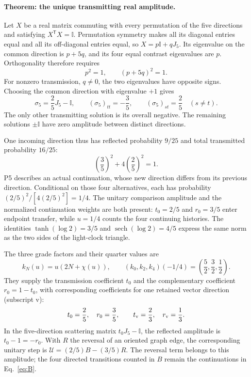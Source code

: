 \documentclass[aps,prx,onecolumn,10pt,notitlepage,nofootinbib,longbibliography]{revtex4-2}
\numberwithin{equation}{section}
\numberwithin{table}{section}
\newcommand{\Id}{\mathbb I}
\begin{document}
\paragraph*{Theorem: the unique transmitting real amplitude.}
Let $X$ be a real matrix commuting with every permutation of the five directions and satisfying $X^{\mathsf T}X=\Id$. Permutation symmetry makes all its diagonal entries equal and all its off-diagonal entries equal, so $X=p\Id+qJ_5$. Its eigenvalue on the common direction is $p+5q$, and its four equal contrast eigenvalues are $p$. Orthogonality therefore requires
\begin{equation}
 p^2=1,\qquad (p+5q)^2=1.
\end{equation}
For nonzero transmission, $q\ne0$, the two eigenvalues have opposite signs. Choosing the common direction with eigenvalue $+1$ gives
\begin{equation}
 \boxed{\sigma_5=\frac25J_5-\Id,\qquad
 (\sigma_5)_{tt}=-\frac35,\qquad
 (\sigma_5)_{st}=\frac25\quad(s\ne t).}
 \label{eq:stepreflection}
\end{equation}
The only other transmitting solution is its overall negative. The remaining solutions $\pm\Id$ have zero amplitude between distinct directions.

One incoming direction thus has reflected probability $9/25$ and total transmitted probability $16/25$:
\begin{equation}
 \left(\frac35\right)^2+4\left(\frac25\right)^2=1.
 \label{eq:stepnorm}
\end{equation}
P5 describes an actual continuation, whose new direction differs from its previous direction. Conditional on those four alternatives, each has probability $(2/5)^2/[4(2/5)^2]=1/4$. The unitary comparison amplitude and the normalized continuation weights are both present: $t_0=2/5$ and $r_0=3/5$ enter endpoint transfer, while $u=1/4$ counts the four continuing histories. The identities $\tanh(\log2)=3/5$ and $\operatorname{sech}(\log2)=4/5$ express the same norm as the two sides of the light-clock triangle.

The three grade factors and their quarter values are
\begin{equation}
 k_N(u)=u(2N+\chi(u)),\qquad
 (k_0,k_2,k_4)(-1/4)=\left(\frac52,\frac32,\frac12\right).
\end{equation}
They supply the transmission coefficient $t_0$ and the complementary coefficient $r_0=1-t_0$, with corresponding coefficients for one retained vector direction (subscript $\mathrm v$):
\begin{equation}
 t_0=\frac25,\quad r_0=\frac35,\qquad
 t_{\rm v}=\frac23,\quad r_{\rm v}=\frac13.
 \label{eq:scattering}
\end{equation}
In the five-direction scattering matrix $t_0J_5-\Id$, the reflected amplitude is $t_0-1=-r_0$. With $R$ the reversal of an oriented graph edge, the corresponding unitary step is $\mathcal U=(2/5)B-(3/5)R$. The reversal term belongs to this amplitude; the four directed transitions counted in $B$ remain the continuations in Eq.~\eqref{eq:B}.
\end{document}
